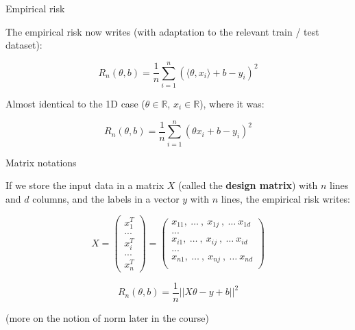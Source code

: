 \documentclass[usenames,dvipsnames,french]{beamer}
\begin{document}
\begin{frame}{Empirical risk}

    The empirical risk now writes (with adaptation to the relevant train / test dataset):

    \begin{equation}
	R_n(\theta, b) = \frac{1}{n}\sum_{i=1}^{n} (\langle\theta, x_i\rangle+b-y_i)^2
    \end{equation}

    Almost identical to the 1D case ($\theta\in \mathbb{R}$, $x_i\in \mathbb{R}$), where it was:

    \begin{equation}
        R_n(\theta, b) = \frac{1}{n}\sum_{i=1}^{n} (\theta x_i+b-y_i)^2
    \end{equation}
\end{frame}

\begin{frame}{Matrix notations}

    If we store the input data in a matrix $X$ (called the \textbf{design matrix}) with $n$ lines and $d$ columns, and the labels in a vector $y$ with $n$ lines, the empirical risk writes:

\begin{equation}
X=
\begin{pmatrix}
x_{1}^T\\
...\\
x_{i}^T\\
...\\
x_{n}^T
\end{pmatrix}
=
\begin{pmatrix}
    x_{11}, \:\dots\:,\: x_{1j}\:, \:\dots\: x_{1d}\\
...\\
    x_{i1}, \:\dots\:,\: x_{ij}\:, \:\dots\: x_{id}\\
...\\
    x_{n1}, \:\dots\:,\: x_{nj}\:, \:\dots\: x_{nd}\\
\end{pmatrix}
\end{equation}

    \begin{equation}
        R_n(\theta, b) = \frac{1}{n}||X\theta-y+b||^2
    \end{equation}

    (more on the notion of norm later in the course)

\end{frame}
\end{document}
